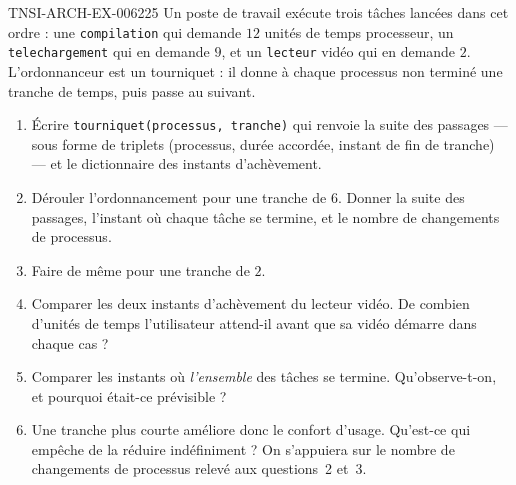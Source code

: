\begin{exercice}{TNSI-ARCH-EX-006}{2}{25}
Un poste de travail exécute trois tâches lancées dans cet ordre : une
\lstinline{compilation} qui demande $12$ unités de temps processeur, un
\lstinline{telechargement} qui en demande $9$, et un \lstinline{lecteur} vidéo
qui en demande $2$. L'ordonnanceur est un tourniquet : il donne à chaque
processus non terminé une tranche de temps, puis passe au suivant.
\begin{enumerate}
  \item Écrire \lstinline{tourniquet(processus, tranche)} qui renvoie la suite
    des passages — sous forme de triplets (processus, durée accordée, instant de
    fin de tranche) — et le dictionnaire des instants d'achèvement.
  \item Dérouler l'ordonnancement pour une tranche de $6$. Donner la suite des
    passages, l'instant où chaque tâche se termine, et le nombre de changements
    de processus.
  \item Faire de même pour une tranche de $2$.
  \item Comparer les deux instants d'achèvement du lecteur vidéo. De combien
    d'unités de temps l'utilisateur attend-il avant que sa vidéo démarre dans
    chaque cas ?
  \item Comparer les instants où \emph{l'ensemble} des tâches se termine.
    Qu'observe-t-on, et pourquoi était-ce prévisible ?
  \item Une tranche plus courte améliore donc le confort d'usage. Qu'est-ce qui
    empêche de la réduire indéfiniment ? On s'appuiera sur le nombre de
    changements de processus relevé aux questions~2 et~3.
\end{enumerate}
\end{exercice}
